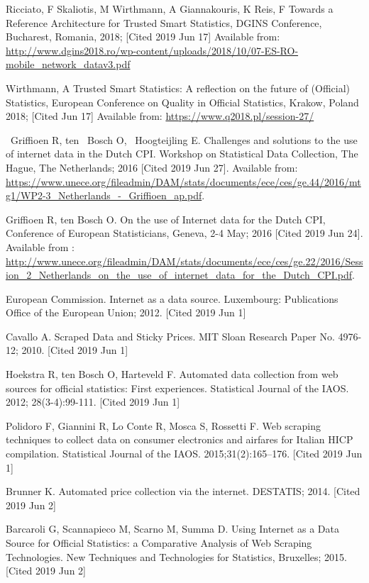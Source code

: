 \documentclass[]{article}
\begin{document}
\begin{thebibliography}{99}
Ricciato, F Skaliotis, M Wirthmann, A Giannakouris, K Reis, F Towards a Reference Architecture for Trusted Smart Statistics, DGINS Conference, Bucharest, Romania, 2018; [Cited 2019 Jun 17]
Available from:
\url{http://www.dgins2018.ro/wp-content/uploads/2018/10/07-ES-RO-mobile_network_datav3.pdf}

Wirthmann, A Trusted Smart Statistics: A reflection on the future of (Official) Statistics, European Conference on Quality in Official Statistics, Krakow, Poland 2018; [Cited Jun 17]
Available from:
\url{https://www.q2018.pl/session-27/}

~Griffioen R, ten ~Bosch O, ~Hoogteijling E. Challenges and solutions to the use of internet data in the Dutch CPI. 
Workshop on Statistical Data Collection, The Hague, The Netherlands; 2016 [Cited 2019 Jun 27]. Available from: \url{https://www.unece.org/fileadmin/DAM/stats/documents/ece/ces/ge.44/2016/mtg1/WP2-3_Netherlands_-_Griffioen_ap.pdf}.

Griffioen R, ten Bosch O. On the use of Internet data for the Dutch CPI,
Conference of European Statisticians, Geneva, 2-4 May; 2016 [Cited 2019 Jun 24]. Available from : \url{http://www.unece.org/fileadmin/DAM/stats/documents/ece/ces/ge.22/2016/Session_2_Netherlands_on_the_use_of_internet_data_for_the_Dutch_CPI.pdf}.

European Commission. Internet as a data source. Luxembourg: Publications Office of the European Union; 2012. [Cited 2019 Jun 1]

Cavallo A. Scraped Data and Sticky Prices. MIT Sloan Research Paper No. 4976-12; 2010. [Cited 2019 Jun 1]

Hoekstra R, ten Bosch O, Harteveld F. Automated data collection from web sources for official statistics: First experiences. 
Statistical Journal of the IAOS. 2012; 28(3-4):99-111. [Cited 2019 Jun 1]

Polidoro F, Giannini R, Lo Conte R, Mosca S, Rossetti F. Web scraping techniques to collect data on consumer electronics and airfares for Italian HICP compilation. Statistical Journal of the IAOS. 2015;31(2):165–176. [Cited 2019 Jun 1]

Brunner K. Automated price collection via the internet. DESTATIS; 2014. [Cited 2019 Jun 2]

Barcaroli G, Scannapieco M, Scarno M, Summa D. Using Internet as a Data Source for Official Statistics: a Comparative Analysis of Web Scraping Technologies.
New Techniques and Technologies for Statistics, Bruxelles; 2015. [Cited 2019 Jun 2]


\end{thebibliography}
\end{document}
